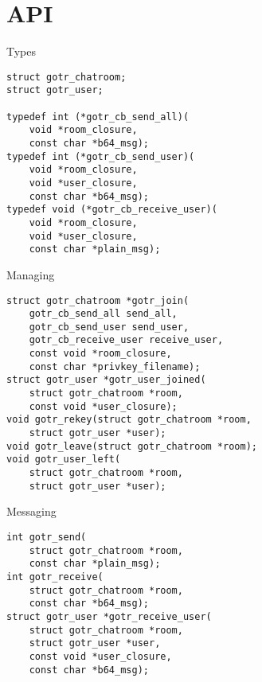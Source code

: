 \section{API}

\lstset{language=C}
\begin{frame}[fragile]{Types}
	\begin{lstlisting}
struct gotr_chatroom;
struct gotr_user;

typedef int (*gotr_cb_send_all)(
    void *room_closure,
    const char *b64_msg);
typedef int (*gotr_cb_send_user)(
    void *room_closure,
    void *user_closure,
    const char *b64_msg);
typedef void (*gotr_cb_receive_user)(
    void *room_closure,
    void *user_closure,
    const char *plain_msg);
	\end{lstlisting}
\end{frame}

\begin{frame}[fragile]{Managing}
	\begin{lstlisting}
struct gotr_chatroom *gotr_join(
    gotr_cb_send_all send_all,
    gotr_cb_send_user send_user,
    gotr_cb_receive_user receive_user,
    const void *room_closure,
    const char *privkey_filename);
struct gotr_user *gotr_user_joined(
    struct gotr_chatroom *room,
    const void *user_closure);
void gotr_rekey(struct gotr_chatroom *room,
    struct gotr_user *user);
void gotr_leave(struct gotr_chatroom *room);
void gotr_user_left(
    struct gotr_chatroom *room,
    struct gotr_user *user);
	\end{lstlisting}
\end{frame}

\begin{frame}[fragile]{Messaging}
	\begin{lstlisting}
int gotr_send(
    struct gotr_chatroom *room,
    const char *plain_msg);
int gotr_receive(
    struct gotr_chatroom *room,
    const char *b64_msg);
struct gotr_user *gotr_receive_user(
    struct gotr_chatroom *room,
    struct gotr_user *user,
    const void *user_closure,
    const char *b64_msg);
	\end{lstlisting}
\end{frame}
